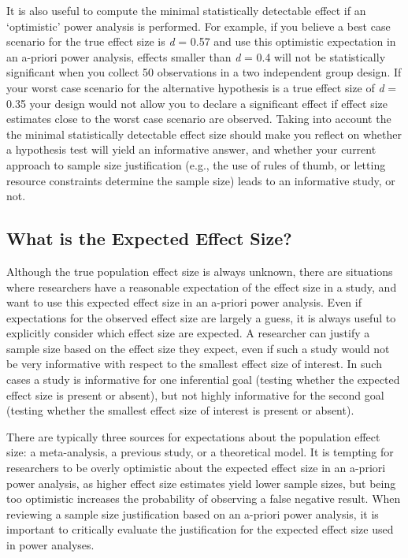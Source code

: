\documentclass[
  english,
  ,jou, a4paper,floatsintext]{apa6}
\begin{document}
It is also useful to compute the minimal statistically detectable effect if an `optimistic' power analysis is performed. For example, if you believe a best case scenario for the true effect size is \emph{d} = 0.57 and use this optimistic expectation in an a-priori power analysis, effects smaller than \emph{d} = 0.4 will not be statistically significant when you collect 50 observations in a two independent group design. If your worst case scenario for the alternative hypothesis is a true effect size of \emph{d} = 0.35 your design would not allow you to declare a significant effect if effect size estimates close to the worst case scenario are observed. Taking into account the the minimal statistically detectable effect size should make you reflect on whether a hypothesis test will yield an informative answer, and whether your current approach to sample size justification (e.g., the use of rules of thumb, or letting resource constraints determine the sample size) leads to an informative study, or not.

\hypertarget{what-is-the-expected-effect-size}{%
\subsection{What is the Expected Effect Size?}\label{what-is-the-expected-effect-size}}

Although the true population effect size is always unknown, there are situations where researchers have a reasonable expectation of the effect size in a study, and want to use this expected effect size in an a-priori power analysis. Even if expectations for the observed effect size are largely a guess, it is always useful to explicitly consider which effect size are expected. A researcher can justify a sample size based on the effect size they expect, even if such a study would not be very informative with respect to the smallest effect size of interest. In such cases a study is informative for one inferential goal (testing whether the expected effect size is present or absent), but not highly informative for the second goal (testing whether the smallest effect size of interest is present or absent).

There are typically three sources for expectations about the population effect size: a meta-analysis, a previous study, or a theoretical model. It is tempting for researchers to be overly optimistic about the expected effect size in an a-priori power analysis, as higher effect size estimates yield lower sample sizes, but being too optimistic increases the probability of observing a false negative result. When reviewing a sample size justification based on an a-priori power analysis, it is important to critically evaluate the justification for the expected effect size used in power analyses.
\end{document}
